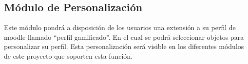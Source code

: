 \subsection*{Módulo de Personalización}

 \noindent 
 Este módulo pondrá a disposición de los usuarios una extensión a su perfil de moodle llamado ``perfil gamificado''. En el cual se podrá
 seleccionar objetos para personalizar su perfil. Esta personalización será visible en los diferentes módulos de este proyecto que soporten
 esta función.










  

